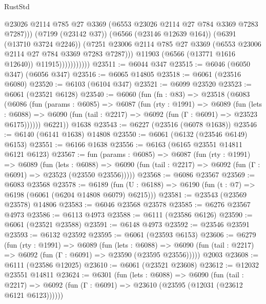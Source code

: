 \begin{lexlean}{RustStd}
\begin{coremodule}
                                @23026
                                @2114
                                @785
                                @27
                                @3369
                                (@6553 @23026 @2114 @27 @784 @3369 @7283 @7287)))
                            (@7199 (@23142 @37))
                            (@6566 (@23146 @12639 @164))
                            (@6391 (@13710 @3724 @2246))
                            (@7251
                              @23006
                              @2114
                              @785
                              @27
                              @3369
                              (@6553 @23006 @2114 @27 @784 @3369 @7283 @7287)))
                          @11903
                          (@6566 (@13771 @1616 @12640))
                          @11915)))))))))))
@23511 := @6044 @347
@23515 := @6046 (@6050 @347) (@6056 @347)
@23516 := @6065 @14805
@23518 := @6061 (@23516 @6080)
@23520 := @6103 (@6104 @347)
@23521 := @6099 @23520
@23523 := @6061 (@23521 @6128)
@23540 := @6060
    (fun (fn : @83) =>
    @23518
      (@6083
        (@6086
          (fun (params : @6085) =>
          @6087
            (fun (rty : @1991) =>
            @6089
              (fun (lets : @6088) =>
              @6090 (fun (tail : @2217) => @6092 (fun (Γ : @6091) => @23523 @6175))))))
        @6221))
    @1638
@23543 := @6227 (@23516 (@6078 @1638))
@23546 := @6140 (@6141 @1638) @14808
@23550 := @6061 (@6132 (@23546 @6149) @6153)
@23551 := @6166 @1638
@23556 := @6163 (@6165 @23551 @14811 @6121 @6123)
@23567 := fun (params : @6085) =>
  @6087
    (fun (rty : @1991) =>
    @6089
      (fun (lets : @6088) =>
      @6090 (fun (tail : @2217) => @6092 (fun (Γ : @6091) => @23523 (@23550 @23556)))))
@23568 := @6086 @23567
@23569 := @6083 @23568
@23578 := @6189
    (fun (U : @6188) => @6190 (fun (t : @7) => @6198 (@6061 (@6204 @14808 @6079) @6215)))
@23581 := @23543 (@23569 @23578) @14806
@23583 := @6046 @23568 @23578
@23585 := @6276 @23567 @4973
@23586 := @6113 @4973
@23588 := @6111 (@23586 @6126)
@23590 := @6061 (@23521 @23588)
@23591 := @6148 @4973
@23592 := @23546 @23591
@23593 := @6132 @23592
@23595 := @6061 (@23593 @6153)
@23606 := @6279
    (fun (rty : @1991) =>
    @6089
      (fun (lets : @6088) =>
      @6090 (fun (tail : @2217) => @6092 (fun (Γ : @6091) => @23590 (@23595 @23556)))))
    @2003
@23608 := @6111 (@23586 @12025)
@23610 := @6061 (@23521 @23608)
@23612 := @12032 @23551 @14811
@23624 := @6301
    (fun (lets : @6088) =>
    @6090
      (fun (tail : @2217) =>
      @6092 (fun (Γ : @6091) => @23610 (@23595 (@12031 (@23612 @6121 @6123))))))

\end{coremodule}
\end{lexlean}
